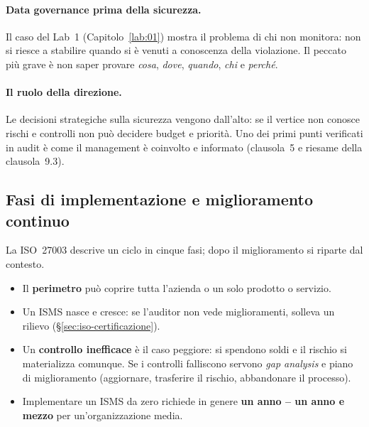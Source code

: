 \paragraph{Data governance prima della sicurezza.} Il caso del Lab~1 (Capitolo~\ref{lab:01}) mostra il
problema di chi non monitora: non si riesce a stabilire quando si è venuti a conoscenza della violazione. Il
peccato più grave è non saper provare \emph{cosa}, \emph{dove}, \emph{quando}, \emph{chi} e \emph{perché}.

\paragraph{Il ruolo della direzione.} Le decisioni strategiche sulla sicurezza vengono dall'alto: se il
vertice non conosce rischi e controlli non può decidere budget e priorità. Uno dei primi punti verificati in
audit è come il management è coinvolto e informato (clausola~5 e riesame della clausola~9.3).

\subsection{Fasi di implementazione e miglioramento continuo}
La ISO~27003 descrive un ciclo in cinque fasi; dopo il miglioramento si riparte dal contesto.
\begin{center}
\end{center}
\begin{itemize}
  \item Il \textbf{perimetro} può coprire tutta l'azienda o un solo prodotto o servizio.
  \item Un ISMS nasce e cresce: se l'auditor non vede miglioramenti, solleva un rilievo
    (\S\ref{sec:iso-certificazione}).
  \item Un \textbf{controllo inefficace} è il caso peggiore: si spendono soldi e il rischio si materializza
    comunque. Se i controlli falliscono servono \emph{gap analysis} e piano di miglioramento (aggiornare,
    trasferire il rischio, abbandonare il processo).
  \item Implementare un ISMS da zero richiede in genere \textbf{un anno -- un anno e mezzo} per
    un'organizzazione media.
\end{itemize}

